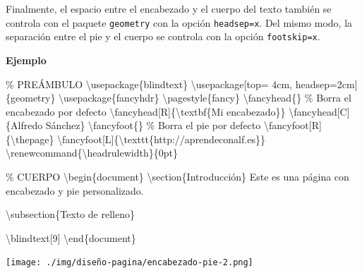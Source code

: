 \documentclass[
  letterpaper,
  DIV=11,
  numbers=noendperiod]{scrreport}
\newenvironment{Shaded}{\begin{snugshade}}{\end{snugshade}}
\newcommand{\BuiltInTok}[1]{\textcolor[rgb]{0.00,0.23,0.31}{#1}}
\newcommand{\CommentTok}[1]{\textcolor[rgb]{0.37,0.37,0.37}{#1}}
\newcommand{\ExtensionTok}[1]{\textcolor[rgb]{0.00,0.23,0.31}{#1}}
\newcommand{\FunctionTok}[1]{\textcolor[rgb]{0.28,0.35,0.67}{#1}}
\newcommand{\KeywordTok}[1]{\textcolor[rgb]{0.00,0.23,0.31}{#1}}
\newcommand{\NormalTok}[1]{\textcolor[rgb]{0.00,0.23,0.31}{#1}}
\begin{document}
Finalmente, el espacio entre el encabezado y el cuerpo del texto también
se controla con el paquete \texttt{geometry} con la opción
\texttt{headsep=x}. Del mismo modo, la separación entre el pie y el
cuerpo se controla con la opción \texttt{footskip=x}.

\textbf{Ejemplo}

\begin{Shaded}
\begin{Highlighting}[]
\CommentTok{\% PREÁMBULO}
\BuiltInTok{\textbackslash{}usepackage}\NormalTok{\{}\ExtensionTok{blindtext}\NormalTok{\}}
\BuiltInTok{\textbackslash{}usepackage}\NormalTok{[top= 4cm, headsep=2cm]\{}\ExtensionTok{geometry}\NormalTok{\}}
\BuiltInTok{\textbackslash{}usepackage}\NormalTok{\{}\ExtensionTok{fancyhdr}\NormalTok{\}}
\FunctionTok{\textbackslash{}pagestyle}\NormalTok{\{fancy\}}
\FunctionTok{\textbackslash{}fancyhead}\NormalTok{\{\} }\CommentTok{\% Borra el encabezado por defecto}
\FunctionTok{\textbackslash{}fancyhead}\NormalTok{[R]\{}\FunctionTok{\textbackslash{}textbf}\NormalTok{\{Mi encabezado\}\}}
\FunctionTok{\textbackslash{}fancyhead}\NormalTok{[C]\{Alfredo Sánchez\}}
\FunctionTok{\textbackslash{}fancyfoot}\NormalTok{\{\} }\CommentTok{\% Borra el pie por defecto}
\FunctionTok{\textbackslash{}fancyfoot}\NormalTok{[R]\{}\FunctionTok{\textbackslash{}thepage}\NormalTok{\}}
\FunctionTok{\textbackslash{}fancyfoot}\NormalTok{[L]\{}\FunctionTok{\textbackslash{}texttt}\NormalTok{\{http://aprendeconalf.es\}\}}
\FunctionTok{\textbackslash{}renewcommand}\NormalTok{\{}\ExtensionTok{\textbackslash{}headrulewidth}\NormalTok{\}\{0pt\}}

\CommentTok{\% CUERPO}
\KeywordTok{\textbackslash{}begin}\NormalTok{\{}\ExtensionTok{document}\NormalTok{\}}
\KeywordTok{\textbackslash{}section}\NormalTok{\{Introducción\}}
\NormalTok{Este es una página con encabezado y pie personalizado.}

\KeywordTok{\textbackslash{}subsection}\NormalTok{\{Texto de relleno\}}

\FunctionTok{\textbackslash{}blindtext}\NormalTok{[9]}
\KeywordTok{\textbackslash{}end}\NormalTok{\{}\ExtensionTok{document}\NormalTok{\}}
\end{Highlighting}
\end{Shaded}

\begin{tcolorbox}[enhanced jigsaw, arc=.35mm, toprule=.15mm, opacitybacktitle=0.6, colback=white, coltitle=black, colbacktitle=quarto-callout-note-color!10!white, breakable, colframe=quarto-callout-note-color-frame, left=2mm, opacityback=0, bottomtitle=1mm, toptitle=1mm, titlerule=0mm, title={Salida}, bottomrule=.15mm, leftrule=.75mm, rightrule=.15mm]
\texttt{[image: ./img/diseño-pagina/encabezado-pie-2.png]}
\end{tcolorbox}
\end{document}
